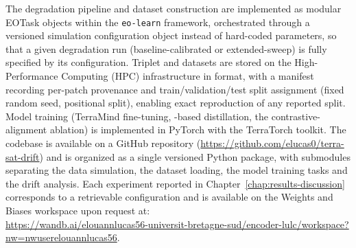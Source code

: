 The degradation pipeline and dataset construction are implemented as modular EOTask objects within the \texttt{eo-learn}\cite{EO_Research_Team2024-oh} framework, orchestrated through a versioned simulation configuration object instead of hard-coded parameters, so that a given degradation run (baseline-calibrated or extended-sweep) is fully specified by its configuration.
Triplet and  datasets are stored on the  High-Performance Computing (HPC) infrastructure in  format, with a manifest recording per-patch provenance and train/validation/test split assignment (fixed random seed, positional split), enabling exact reproduction of any reported split.
Model training (TerraMind fine-tuning, -based distillation, the contrastive-alignment ablation) is implemented in PyTorch with the TerraTorch\cite{gomes2025terratorch} toolkit.
The codebase is available on a GitHub repository (\url{https://github.com/elucas0/terra-sat-drift}) and is organized as a single versioned Python package, with submodules separating the data simulation, the dataset loading, the model training tasks and the drift analysis.
Each experiment reported in Chapter~\ref{chap:results-discussion} corresponds to a retrievable configuration and is available on the Weights and Biases workspace upon request at: \\ \url{https://wandb.ai/elouannlucas56-universit-bretagne-sud/encoder-lulc/workspace?nw=nwuserelouannlucas56}.